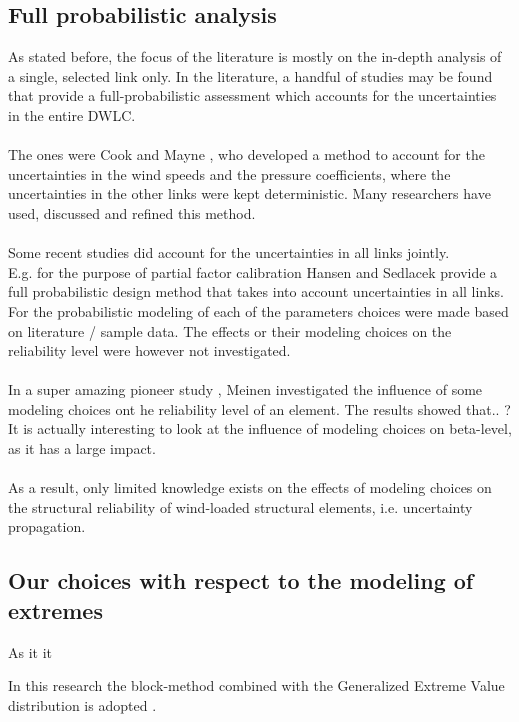 \documentclass[fleqn]{article}
\begin{document}
\subsection{Full probabilistic analysis}
As stated before, the focus of the literature is mostly on the in-depth analysis of a single, selected link only. In the literature, a handful of studies may be found that provide a full-probabilistic assessment which accounts for the uncertainties in the entire DWLC.  \\
\\
The ones were Cook and Mayne \cite{Mayne1979109}, who developed a method  to account for the uncertainties in the wind speeds and the pressure coefficients, where the uncertainties in the other links were kept deterministic.  Many researchers \cite{Kasperski2003527,Harris_2003} have used, discussed and refined this method.\\
\\
Some recent studies did account for the uncertainties in all links jointly. \\
E.g. for the purpose of partial factor calibration Hansen \cite{Hansen_2015} and Sedlacek provide a full probabilistic design method that takes into account uncertainties in all links. For the probabilistic modeling of each of the parameters choices were made based on literature / sample data. The effects or their modeling choices on the reliability level were however not investigated. \\
\\
In a super amazing pioneer study , Meinen investigated the influence of some modeling choices ont he reliability level of an element. The results showed that.. ? It is actually interesting to look at the influence of modeling choices on beta-level, as it has a large impact. \\
\\
As a result, only limited knowledge exists on the effects of modeling choices on the structural reliability of wind-loaded structural elements, i.e. uncertainty propagation.



\subsection{Our choices with respect to the modeling of extremes}
As it it 

In this research the block-method combined with the Generalized Extreme Value distribution is adopted \cite{CUR_103} \cite{Kasperski2003527} \cite{Holmes2003893}. 
\end{document}
